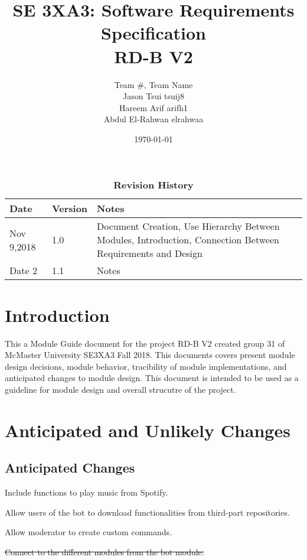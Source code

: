 \documentclass[12pt, titlepage]{article}
\title{SE 3XA3: Software Requirements Specification\\RD-B V2}
\author{Team \#, Team Name
		\\ Jason Tsui tsuij8
		\\ Hareem Arif arifh1
		\\ Abdul El-Rahwan elrahwaa
}
\date{\today}
\newcounter{acnum}
\newcommand{\actheacnum}{AC\theacnum}
\begin{document}
\maketitle

\tableofcontents
\listoftables
\listoffigures

\begin{table}[bp]
\caption{\bf Revision History}
\begin{tabularx}{\textwidth}{p{3cm}p{2cm}X}
\toprule {\bf Date} & {\bf Version} & {\bf Notes}\\
\midrule
Nov 9,2018 & 1.0 & Document Creation, Use Hierarchy Between Modules, Introduction, Connection Between Requirements and Design\\
Date 2 & 1.1 & Notes\\
\bottomrule
\end{tabularx}
\end{table}

\newpage


\section{Introduction}

This a Module Guide document for the project RD-B V2 created group 31 of McMaster University SE3XA3 Fall 2018. This documents covers present module design decisions, module behavior, tracibility of module implementations, and anticipated changes to module design. This document is intended to be used as a guideline for module design and overall strucutre of the project. 

\section{Anticipated and Unlikely Changes} \label{SecChange}


\subsection{Anticipated Changes} \label{SecAchange}


\begin{description}
\color{blue}
\item[\refstepcounter{acnum} \actheacnum \label{acAudio}:] Include functions to play music from Spotify.
\color{black}
\item[\refstepcounter{acnum} \actheacnum
\label{acDownloader}:] Allow users of the bot to download functionalities from third-part repositories.
\item[\refstepcounter{acnum} \actheacnum
\label{acCustomcom}:] Allow moderator to create custom commands.
\item[\refstepcounter{acnum} \actheacnum
\label{acBot}:] \st{Connect to the different modules from the bot module.}
\end{description}
\end{document}
